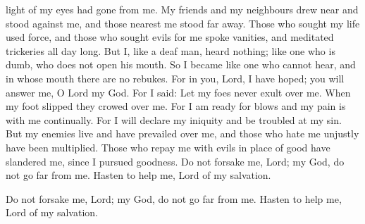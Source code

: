\documentclass{article}
\begin{document}
\begin{service}
\begin{multicols}{2}
{  light of my eyes had gone from me. My friends and my neighbours drew near and
  stood against me, and those nearest me stood far away. Those who sought my life
  used force, and those who sought evils for me spoke vanities, and meditated
  trickeries all day long. But I, like a deaf man, heard nothing; like one who is
  dumb, who does not open his mouth. So I became like one who cannot hear, and in
  whose mouth there are no rebukes. For in you, Lord, I have hoped; you will
  answer me, O Lord my God. For I  said: Let my foes never exult over me.
  When my foot slipped they crowed over me. For I am ready for blows and my pain
  is with me continually. For I will declare my iniquity and be troubled at my sin.
  But my enemies live and have prevailed over me, and those who hate me unjustly
  have been multiplied. Those who repay me with evils in place of good have
  slandered me, since I pursued goodness. Do not forsake me, Lord; my God, do not
  go far from me. Hasten to help me, Lord of my salvation.
  \andagain
  \item Do not forsake me, Lord; my God, do not go far from me. Hasten to help me,
  Lord of my salvation. 
}
\rest
{}
\end{multicols}
\end{service}
\end{document}
